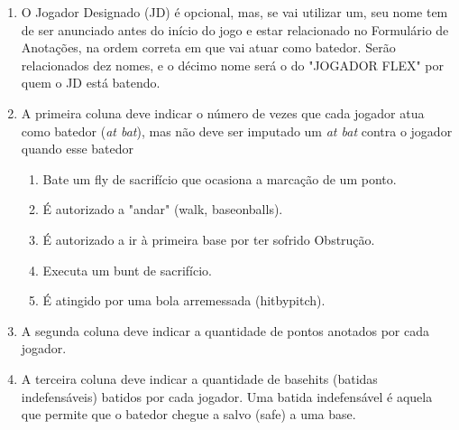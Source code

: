		\begin{enumerate}[label=\arabic*)]
			\item O Jogador Designado (JD) é opcional, mas, se vai utilizar um, seu nome tem de ser anunciado antes do início do jogo e estar relacionado no Formulário de Anotações, na ordem correta em que vai atuar como batedor. Serão relacionados dez nomes, e o décimo nome será o do "JOGADOR FLEX"{} por quem o JD está batendo.


			\item A primeira coluna deve indicar o número de vezes que cada jogador atua como batedor (\textit{at bat}), mas não deve ser imputado um \textit{at bat} contra o jogador quando esse batedor

				\begin{enumerate}[label=(\alph*)]
					\item Bate um \gls{fly} de sacrifício que ocasiona a marcação de um ponto.
					\item É autorizado a "andar" (\gls{walk}, \gls{baseonballs}).
					\item É autorizado a ir à primeira base por ter sofrido Obstrução.
					\item Executa um \gls{bunt} de sacrifício.
					\item É atingido por uma bola arremessada (\gls{hitbypitch}).
			\end{enumerate}

			\item A segunda coluna deve indicar a quantidade de pontos anotados por cada jogador.

			\item A terceira coluna deve indicar a quantidade de \glspl{basehit} (batidas indefensáveis) batidos por cada jogador. Uma batida indefensável é aquela que permite que o batedor chegue a salvo (\gls{safe}) a uma base.


\end{enumerate}
